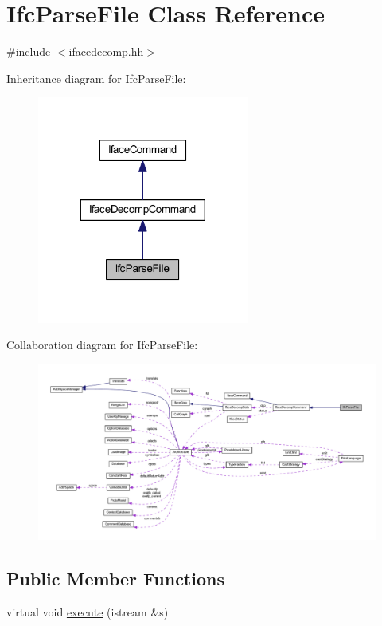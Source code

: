 \hypertarget{class_ifc_parse_file}{}\section{Ifc\+Parse\+File Class Reference}
\label{class_ifc_parse_file}


{\ttfamily \#include $<$ifacedecomp.\+hh$>$}



Inheritance diagram for Ifc\+Parse\+File\+:
\nopagebreak
\begin{figure}[H]
\begin{center}
\leavevmode
\includegraphics[width=197pt]{class_ifc_parse_file__inherit__graph}
\end{center}
\end{figure}


Collaboration diagram for Ifc\+Parse\+File\+:
\nopagebreak
\begin{figure}[H]
\begin{center}
\leavevmode
\includegraphics[width=350pt]{class_ifc_parse_file__coll__graph}
\end{center}
\end{figure}
\subsection*{Public Member Functions}
\begin{DoxyCompactItemize}
\item 
virtual void \mbox{\hyperlink{class_ifc_parse_file_abe050f74bc02c78b231ed636e629b3ca}{execute}} (istream \&s)
\end{DoxyCompactItemize}

